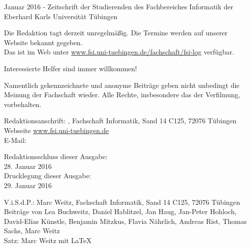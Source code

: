 \nameit \space \space Januar 2016 - Zeitschrift der Studierenden des Fachbereiches Informatik der Eberhard Karls Universität Tübingen

Die Redaktion tagt derzeit unregelmäßig. Die Termine werden auf unserer Website bekannt  gegeben.\\
Das \nameit \space ist  im  Web  unter \url{www.fsi.uni-tuebingen.de/fachschaft/fsi-log} verfügbar.

Interessierte Helfer sind immer willkommen!

Namentlich gekennzeichnete und anonyme Beiträge geben nicht unbedingt die Meinung der Fachschaft wieder. Alle Rechte, insbesondere das der Verfilmung, vorbehalten.

Redaktionsanschrift:
\nameit, Fachschaft Informatik, Sand 14 C125, 72076 Tübingen\\
Webseite \url{www.fsi.uni-tuebingen.de}\\
E-Mail:

Redaktionsschluss dieser Ausgabe:\\
28. Januar 2016\\
Drucklegung dieser Ausgabe:\\
29. Januar 2016

V.i.S.d.P.: Marc Weitz, Fachschaft Informatik, Sand 14 C125, 72076 Tübingen\\
Beiträge von Lea Buchweitz, Daniel Hablitzel, Jan Haug, Jan-Peter Hohloch, David-Elias Künstle, Benjamin Mitzkus, Flavia Nährlich, Andreas Rist, Thomas Sachs, Marc Weitz\\
Satz: Marc Weitz mit \LaTeX 


